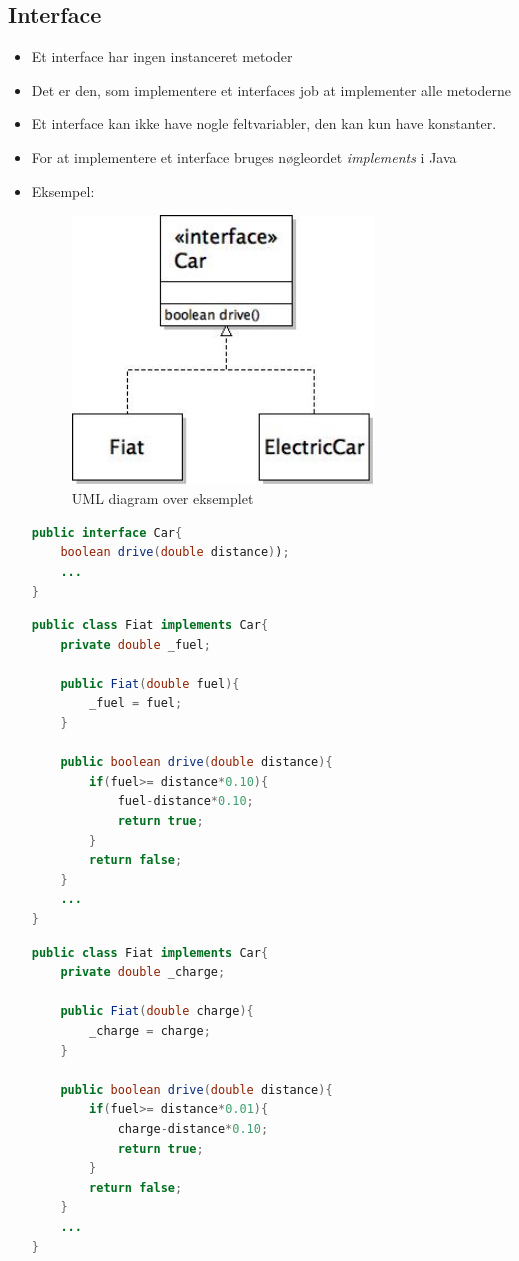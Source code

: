 \documentclass{article}
\begin{document}
\subsection{Interface}
\begin{itemize}
	\item Et interface har ingen instanceret metoder
	\item Det er den, som implementere et interfaces job at implementer alle metoderne
	\item Et interface kan ikke have nogle feltvariabler, den kan kun have konstanter. 
	\item For at implementere et interface bruges nøgleordet \textit{implements} i Java
	\item Eksempel:
	\begin{figure}[ht!]
		\centering
		\includegraphics[width=80mm]{img/UMLiconeksempel.jpeg}
		\caption{UML diagram over eksemplet	\label{UMLiconeksempel}}
	\end{figure}
\begin{lstlisting}[language=java]
public interface Car{
	boolean drive(double distance));
	...
}
\end{lstlisting}
\begin{lstlisting}[language=java]
public class Fiat implements Car{
	private double _fuel;
	
	public Fiat(double fuel){
		_fuel = fuel;
	}
	
	public boolean drive(double distance){
		if(fuel>= distance*0.10){
			fuel-distance*0.10;
			return true;
		}
		return false;
	}
	...
}
\end{lstlisting}
\begin{lstlisting}[language=java]
public class Fiat implements Car{
	private double _charge;
	
	public Fiat(double charge){
		_charge = charge;
	}
	
	public boolean drive(double distance){
		if(fuel>= distance*0.01){
			charge-distance*0.10;
			return true;
		}
		return false;
	}
	...
}
\end{lstlisting}
\end{itemize}
\end{document}
